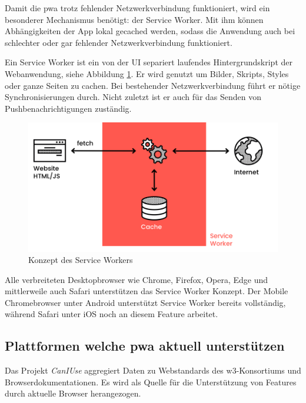 Damit die \ac{pwa} trotz fehlender Netzwerkverbindung funktioniert, wird ein besonderer Mechanismus benötigt: der Service Worker. Mit ihm können Abhängigkeiten der App lokal gecached werden, sodass die Anwendung auch bei schlechter oder gar fehlender Netzwerkverbindung funktioniert. \cite[S. 7]{BeginningPWA}

Ein Service Worker ist ein von der UI separiert laufendes Hintergrundskript der Webanwendung, siehe Abbildung \ref{fig:serviceWorker}. Er wird genutzt um Bilder, Skripts, Styles oder ganze Seiten zu cachen. Bei bestehender Netzwerkverbindung führt er nötige Synchronisierungen durch. Nicht zuletzt ist er auch für das Senden von Pushbenachrichtigungen zuständig. \cite[S. 24]{BeginningPWA}

\begin{figure}[h!]
        \includegraphics[width=\linewidth]{img/ServiceWorker-8a0968f1b295f1ff.png}
        \centering
        \caption{Konzept des Service Workers \cite{ServiceWorkerDiagramm}}
        \label{fig:serviceWorker}
\end{figure}


Alle verbreiteten Desktopbrowser wie Chrome, Firefox, Opera, Edge und mittlerweile auch Safari unterstützen das Service Worker Konzept. Der Mobile Chromebrowser unter Android unterstützt Service Worker bereits vollständig, während Safari unter iOS noch an diesem Feature arbeitet. \cite[S. 9]{BeginningPWA}


\subsection{Plattformen welche \ac{pwa} aktuell unterstützen}
Das Projekt \textit{CanIUse} aggregiert Daten zu Webstandards des w3-Konsortiums und Browserdokumentationen. Es wird als Quelle für die Unterstützung von Features durch aktuelle Browser herangezogen.

